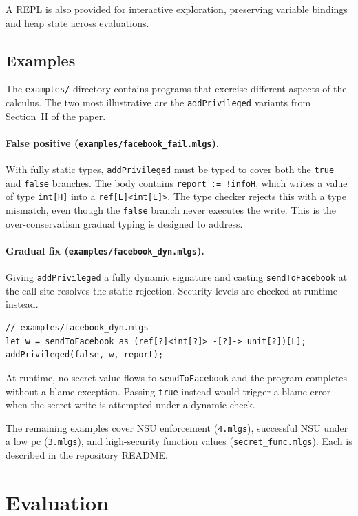 \documentclass[11pt,a4paper]{article}
\begin{document}
A REPL is also provided for interactive exploration, preserving variable bindings and heap
state across evaluations.

\subsection*{Examples}

The \texttt{examples/} directory contains programs that exercise different aspects of the
calculus. The two most illustrative are the \texttt{addPrivileged} variants from Section~II
of the paper.

\paragraph{False positive (\texttt{examples/facebook\_fail.mlgs}).}
With fully static types, \texttt{addPrivileged} must be typed to cover both the
\texttt{true} and \texttt{false} branches. The body contains \texttt{report := !infoH},
which writes a value of type \texttt{int[H]} into a \texttt{ref[L]<int[L]>}. The type
checker rejects this with a type mismatch, even though the \texttt{false} branch never
executes the write. This is the over-conservatism gradual typing is designed to address.

\paragraph{Gradual fix (\texttt{examples/facebook\_dyn.mlgs}).}
Giving \texttt{addPrivileged} a fully dynamic signature and casting \texttt{sendToFacebook}
at the call site resolves the static rejection. Security levels are checked at runtime instead.

\begin{lstlisting}
// examples/facebook_dyn.mlgs
let w = sendToFacebook as (ref[?]<int[?]> -[?]-> unit[?])[L];
addPrivileged(false, w, report);
\end{lstlisting}

At runtime, no secret value flows to \texttt{sendToFacebook} and the program completes
without a blame exception. Passing \texttt{true} instead would trigger a blame error
when the secret write is attempted under a dynamic check.

The remaining examples cover NSU enforcement (\texttt{4.mlgs}), successful NSU under a
low pc (\texttt{3.mlgs}), and high-security function
values (\texttt{secret\_func.mlgs}). Each is described in the repository README.

\section{Evaluation}
\end{document}
